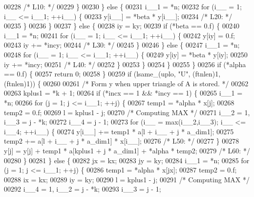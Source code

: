 \begin{DoxyCode}
00228 \textcolor{comment}{/* L10: */}
00229         \}
00230         \} \textcolor{keywordflow}{else} \{
00231         i\_\_1 = *n;
00232         \textcolor{keywordflow}{for} (i\_\_ = 1; i\_\_ <= i\_\_1; ++i\_\_) \{
00233             y[i\_\_] = *beta * y[i\_\_];
00234 \textcolor{comment}{/* L20: */}
00235         \}
00236         \}
00237     \} \textcolor{keywordflow}{else} \{
00238         iy = ky;
00239         \textcolor{keywordflow}{if} (*beta == 0.f) \{
00240         i\_\_1 = *n;
00241         \textcolor{keywordflow}{for} (i\_\_ = 1; i\_\_ <= i\_\_1; ++i\_\_) \{
00242             y[iy] = 0.f;
00243             iy += *incy;
00244 \textcolor{comment}{/* L30: */}
00245         \}
00246         \} \textcolor{keywordflow}{else} \{
00247         i\_\_1 = *n;
00248         \textcolor{keywordflow}{for} (i\_\_ = 1; i\_\_ <= i\_\_1; ++i\_\_) \{
00249             y[iy] = *beta * y[iy];
00250             iy += *incy;
00251 \textcolor{comment}{/* L40: */}
00252         \}
00253         \}
00254     \}
00255     \}
00256     \textcolor{keywordflow}{if} (*alpha == 0.f) \{
00257     \textcolor{keywordflow}{return} 0;
00258     \}
00259     \textcolor{keywordflow}{if} (lsame\_(uplo, \textcolor{stringliteral}{"U"}, (ftnlen)1, (ftnlen)1)) \{
00260 
00261 \textcolor{comment}{/*        Form  y  when upper triangle of A is stored. */}
00262 
00263     kplus1 = *k + 1;
00264     \textcolor{keywordflow}{if} (*incx == 1 && *incy == 1) \{
00265         i\_\_1 = *n;
00266         \textcolor{keywordflow}{for} (j = 1; j <= i\_\_1; ++j) \{
00267         temp1 = *alpha * x[j];
00268         temp2 = 0.f;
00269         l = kplus1 - j;
00270 \textcolor{comment}{/* Computing MAX */}
00271         i\_\_2 = 1, i\_\_3 = j - *k;
00272         i\_\_4 = j - 1;
00273         \textcolor{keywordflow}{for} (i\_\_ = max(i\_\_2,i\_\_3); i\_\_ <= i\_\_4; ++i\_\_) \{
00274             y[i\_\_] += temp1 * a[l + i\_\_ + j * a\_dim1];
00275             temp2 += a[l + i\_\_ + j * a\_dim1] * x[i\_\_];
00276 \textcolor{comment}{/* L50: */}
00277         \}
00278         y[j] = y[j] + temp1 * a[kplus1 + j * a\_dim1] + *alpha * temp2;
00279 \textcolor{comment}{/* L60: */}
00280         \}
00281     \} \textcolor{keywordflow}{else} \{
00282         jx = kx;
00283         jy = ky;
00284         i\_\_1 = *n;
00285         \textcolor{keywordflow}{for} (j = 1; j <= i\_\_1; ++j) \{
00286         temp1 = *alpha * x[jx];
00287         temp2 = 0.f;
00288         ix = kx;
00289         iy = ky;
00290         l = kplus1 - j;
00291 \textcolor{comment}{/* Computing MAX */}
00292         i\_\_4 = 1, i\_\_2 = j - *k;
00293         i\_\_3 = j - 1;

\end{DoxyCode}
